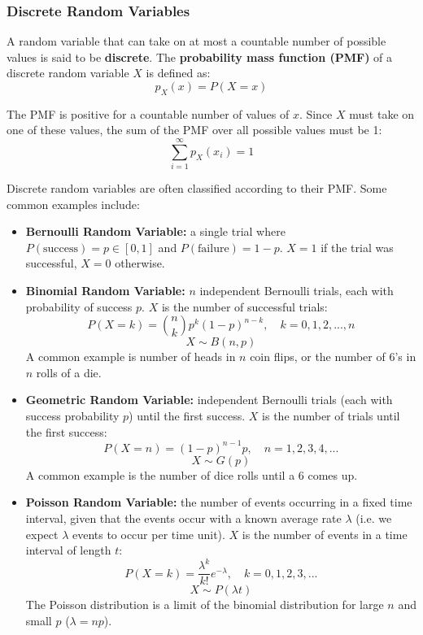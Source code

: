 \documentclass[12pt]{article}
\begin{document}
\subsubsection{Discrete Random Variables}
A random variable that can take on at most a countable number of possible values is said to be \textbf{discrete}.
The \textbf{probability mass function (PMF)} of a discrete random variable $X$ is defined as:
\[ p_X(x) = P(X = x) \]

\noindent
The PMF is positive for a countable number of values of $x$.
Since $X$ must take on one of these values, the sum of the PMF over all possible values must be 1:
\[ \sum_{i = 1}^{\infty} p_X(x_i) = 1 \]

\newpage
\noindent
Discrete random variables are often classified according to their PMF.
Some common examples include:

\begin{itemize}
    \item \textbf{Bernoulli Random Variable:} a single trial where $P(\text{success}) = p \in [0, 1]$ and $P(\text{failure}) = 1 - p$. $X = 1$ if the trial was successful, $X = 0$ otherwise.
    \item \textbf{Binomial Random Variable:} $n$ independent Bernoulli trials, each with probability of success $p$. $X$ is the number of successful trials:
    \[ P(X = k) = \binom{n}{k}p^k(1 - p)^{n - k}, \quad k = 0, 1, 2, ... , n \]
    \[ X \sim B(n, p) \]
    A common example is number of heads in $n$ coin flips, or the number of 6's in $n$ rolls of a die.
    \item \textbf{Geometric Random Variable:} independent Bernoulli trials (each with success probability $p$) until the first success. $X$ is the number of trials until the first success:
    \[ P(X = n) = (1 - p)^{n - 1}p, \quad n = 1, 2, 3, 4, ... \]
    \[ X \sim G(p) \]
    A common example is the number of dice rolls until a 6 comes up.
    \item \textbf{Poisson Random Variable:} the number of events occurring in a fixed time interval, given that the events occur with a known average rate $\lambda$ (i.e. we expect $\lambda$ events to occur per time unit). $X$ is the number of events in a time interval of length $t$:
    \[ P(X = k) = \frac{\lambda^k}{k!}e^{-\lambda}, \quad k = 0, 1, 2, 3, ... \]
    \[ X \sim P(\lambda t) \]
    The Poisson distribution is a limit of the binomial distribution for large $n$ and small $p$ ($\lambda = np$). 
\end{itemize}
\end{document}
